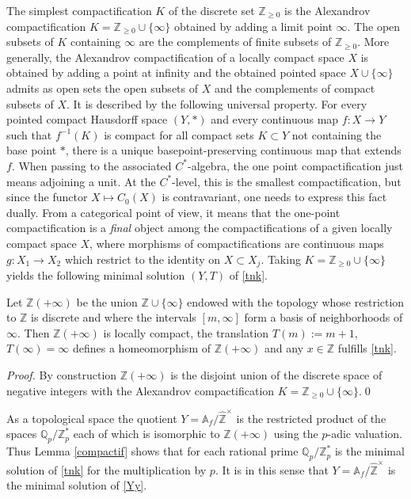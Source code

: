 \documentclass[graybox, envcountsect%
]{svmult}
\def\A{{\mathbb A}}
\def\Q{{\mathbb Q}}
\def\Z{{\mathbb Z}}
\def\hatz{{\hat\Z^\times}}
\begin{document}
 The simplest compactification $K$ of the discrete set $\Z_{\geq 0}$ is the Alexandrov compactification $K=\Z_{\geq 0}\cup \{\infty\}$ obtained by  adding a limit point $\infty$.  The open subsets of $K$ containing $\infty$ are the complements of finite subsets of  $\Z_{\geq 0}$.  More generally, the  Alexandrov compactification  
of a locally compact space $X$  is obtained by adding a point at infinity and the obtained pointed  space $X\cup \{\infty\}$ admits as open sets the open subsets of $X$ and the complements of compact subsets of $X$. It 
 is described by the following universal property. 
For every pointed compact Hausdorff space $(Y,*)$
 and every continuous map $f:X\to Y$ such that $f^{-1}(K)$  
 is compact for all compact sets 
$K\subset Y$
 not containing the base point $*$, there is a unique basepoint-preserving continuous map 
 that extends $f$. When passing to the associated $C^*$-algebra,  the one point compactification just means  adjoining a unit. At  the $C^*$-level, this is the smallest compactification, but since the functor $X\mapsto C_0(X)$ is contravariant, one needs to express this fact dually. From a categorical point of view, it means that the one-point compactification is a \emph{final} object among the compactifications of a given locally compact space $X$, where morphisms of compactifications are continuous maps $g:X_1\to X_2$ which restrict to the identity on $X\subset X_j$. \newline
 Taking $K=\Z_{\geq 0}\cup \{\infty\}$ yields the following minimal solution $(Y,T)$ of \eqref{tnk}.
 \begin{lemma}\label{compactif1}
Let $\Z(+\infty)$ be the union $\Z\cup \{\infty\}$ endowed with the topology whose restriction to $\Z$ is discrete and where the intervals $[m,\infty]$ form a basis of neighborhoods of $\infty$. Then $\Z(+\infty)$ is locally compact, the translation $T(m):=m+1$, $T(\infty)=\infty$ defines a homeomorphism of $\Z(+\infty)$ and any $x\in \Z$ fulfills \eqref{tnk}.
\end{lemma}
 \begin{proof} By construction $\Z(+\infty)$ is the disjoint union of the discrete space of negative integers with the  Alexandrov compactification $K=\Z_{\geq 0}\cup \{\infty\}$.\qed \end{proof}

\begin{rem}\label{adeliccompactif}
	As a topological space the quotient $Y=\A_f/\hatz$
 is the restricted product of the spaces $\Q_p/\Z_p^*$ each of which is isomorphic to $\Z(+\infty)$ using the $p$-adic valuation. Thus Lemma \ref{compactif} shows that for each rational prime $\Q_p/\Z_p^*$ is the minimal solution of \eqref{tnk} for the multiplication  by $p$. It is  in this sense that $Y=\A_f/\hatz$ is the minimal solution of \eqref{Yy}.
\end{rem}
\end{document}
